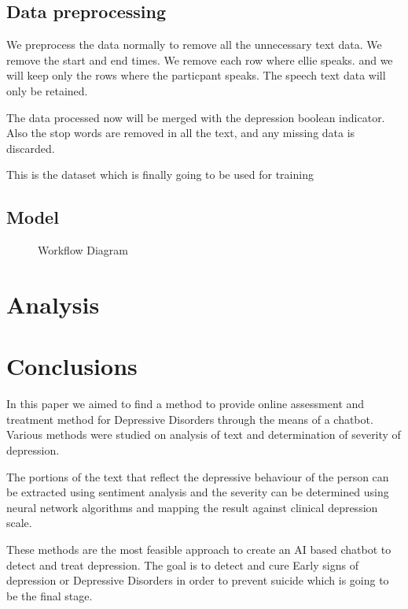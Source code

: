 \documentclass[runningheads]{llncs}
\begin{document}
\subsection{Data preprocessing}
We preprocess the data normally to remove all the unnecessary text data. We remove the start and end times. We remove each row where ellie speaks. and we will keep only the rows where the particpant speaks. The speech text data will only be retained.

The data processed now will be merged with the depression boolean indicator. Also the stop words are removed in all the text, and any missing data is discarded.

This is the dataset which is finally going to be used for training

\subsection{Model}

\begin{figure}[!ht]
\centering
{}
\caption{Workflow Diagram}
\label{figure:workflow}
\end{figure}
\section{Analysis}

\section{Conclusions}
In this paper we aimed to find a method to provide online assessment and treatment method for Depressive Disorders through the means of a chatbot. Various methods were studied on analysis of text and determination of severity of depression. 

The portions of the text that reflect the depressive behaviour of the person can be extracted using sentiment analysis and the severity  can be determined using neural network algorithms and mapping the result against clinical depression scale. 

These methods are the most feasible approach to create an AI based chatbot to detect and treat depression. The goal is to detect and cure Early signs of depression or Depressive Disorders in order to prevent suicide which is going to be the final stage.



\end{document}
